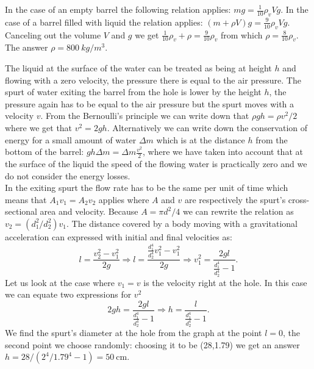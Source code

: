 \documentclass[11pt]{article}
\begin{document}

\solueng
In the case of an empty barrel the following relation applies: $mg=\frac 1{10}\rho_vVg$. In the case of a barrel filled with liquid the relation applies: $(m+\rho V)g=\frac 9{10}\rho_vVg$. Canceling out the volume $V$ and $g$ we get $\frac 1{10}\rho_v+\rho=\frac 9{10}\rho_v$ from which $\rho=\frac 8{10}\rho_v$. The answer $\rho= \SI{800}{kg/m^3}$.
\probend
\bigskip


\solueng
The liquid at the surface of the water can be treated as being at height $h$ and flowing with a zero velocity, the pressure there is equal to the air pressure. The spurt of water exiting the barrel from the hole is lower by the height $h$, the pressure again has to be equal to the air pressure but the spurt moves with a velocity $v$. From the Bernoulli’s principle we can write down that $\rho g h = \rho v^2/2$ where we get that $v^2=2gh$. Alternatively we can write down the conservation of energy for a small amount of water $\Delta m$ which is at the distance $h$ from the bottom of the barrel: $ g h \Delta m = \Delta m \frac{v^2}{2}$, where we have taken into account that at the surface of the liquid the speed of the flowing water is practically zero and we do not consider the energy losses.\\
In the exiting spurt the flow rate has to be the same per unit of time which means that $A_1v_1=A_2v_2$ applies where $A$ and $v$ are respectively the spurt’s cross-sectional area and velocity. Because $A=\pi d^2/4$ we can rewrite the relation as $v_2=(d_1^2/d_2^2)v_1$. The distance covered by a body moving with a gravitational acceleration can expressed with initial and final velocities as:
$$l=\frac{v_2^2-v_1^2}{2g} \Rightarrow l=\frac{\frac{d_1^4}{d_2^4}v_1^2-v_1^2}{2g} \Rightarrow v_1^2=\frac{2gl}{\frac{d_1^4}{d_2^4}-1}.$$
Let us look at the case where $v_1=v$ is the velocity right at the hole. In this case we can equate two expressions for $v^2$ 
$$2gh=\frac{2gl}{\frac{d_1^4}{d_2^4}-1}\Rightarrow h=\frac{l}{\frac{d_1^4}{d_2^4}-1}.$$
We find the spurt’s diameter at the hole from the graph at the point $l=0$, the second point we choose randomly: choosing it to be (28,\num{1.79}) we get an answer $h=28/(2^4/\num{1.79}^4-1)=\SI{50}{\cm}$.
\probend
\bigskip
\end{document}
